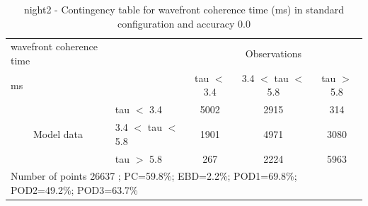 \begin{table}[p!]
\begin{center}
\begin{tabular}{llccc}
\hline
{wavefront coherence time}                                       &                                                    & \multicolumn{3}{c}{Observations}                 \\
{ms}                                       &                             & tau $<$ 3.4   & 3.4 $<$ tau $<$ 5.8 & tau $>$ 5.8 \\
\hline
\multicolumn{1}{c}{\multirow{3}{*}{Model data}}  & tau $<$ 3.4             & 5002                & 2915                       & 314              \\
                                                 & 3.4  $<$ tau $<$ 5.8 & 1901                & 4971                       & 3080              \\
                                                 & tau $>$ 5.8             & 267                & 2224                       & 5963              \\
\hline
\multicolumn{5}{l}{ Number of points        26637 ; PC=59.8\%; EBD=2.2\%; POD1=69.8\%; POD2=49.2\%; POD3=63.7\%}
\end{tabular}
\end{center}
\caption{night2 - Contingency table for  wavefront coherence time (ms) in standard configuration and accuracy 0.0}
\label{tab:contingencytauBEF:night2}
\end{table}
